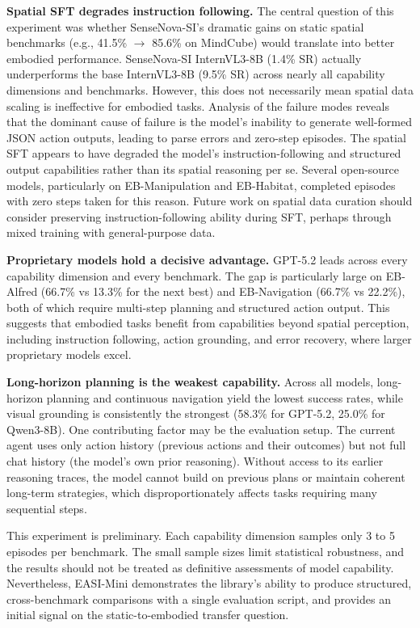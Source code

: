 \textbf{Spatial SFT degrades instruction following.} The central question of this experiment was whether SenseNova-SI's dramatic gains on static spatial benchmarks (e.g., 41.5\% $\to$ 85.6\% on MindCube) would translate into better embodied performance. SenseNova-SI InternVL3-8B (1.4\% SR) actually underperforms the base InternVL3-8B (9.5\% SR) across nearly all capability dimensions and benchmarks. However, this does not necessarily mean spatial data scaling is ineffective for embodied tasks. Analysis of the failure modes reveals that the dominant cause of failure is the model's inability to generate well-formed JSON action outputs, leading to parse errors and zero-step episodes. The spatial SFT appears to have degraded the model's instruction-following and structured output capabilities rather than its spatial reasoning per se. Several open-source models, particularly on EB-Manipulation and EB-Habitat, completed episodes with zero steps taken for this reason. Future work on spatial data curation should consider preserving instruction-following ability during SFT, perhaps through mixed training with general-purpose data.

\textbf{Proprietary models hold a decisive advantage.} GPT-5.2 leads across every capability dimension and every benchmark. The gap is particularly large on EB-Alfred (66.7\% vs 13.3\% for the next best) and EB-Navigation (66.7\% vs 22.2\%), both of which require multi-step planning and structured action output. This suggests that embodied tasks benefit from capabilities beyond spatial perception, including instruction following, action grounding, and error recovery, where larger proprietary models excel.

\textbf{Long-horizon planning is the weakest capability.} Across all models, long-horizon planning and continuous navigation yield the lowest success rates, while visual grounding is consistently the strongest (58.3\% for GPT-5.2, 25.0\% for Qwen3-8B). One contributing factor may be the evaluation setup. The current agent uses only action history (previous actions and their outcomes) but not full chat history (the model's own prior reasoning). Without access to its earlier reasoning traces, the model cannot build on previous plans or maintain coherent long-term strategies, which disproportionately affects tasks requiring many sequential steps.

This experiment is preliminary. Each capability dimension samples only 3 to 5 episodes per benchmark. The small sample sizes limit statistical robustness, and the results should not be treated as definitive assessments of model capability. Nevertheless, EASI-Mini demonstrates the library's ability to produce structured, cross-benchmark comparisons with a single evaluation script, and provides an initial signal on the static-to-embodied transfer question.
